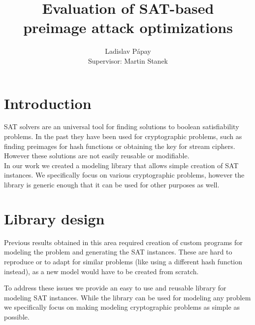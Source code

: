 \documentclass[myposter,portrait]{sciposter}
\def\mysection#1{
{\color{sectionCol}\section*{\sc\bfseries #1}}}
\begin{document}
\setlength{\logowidth}{20cm}
\setlength{\titlewidth}{\textwidth}
\addtolength{\titlewidth}{-\logowidth}
\useleftlogofalse

\color{textCol}

\title{Evaluation of SAT-based\\ preimage attack optimizations}
\author{Ladislav P\'apay\\
        Supervisor: Martin Stanek}
\maketitle

\begin{multicols*}{3}

\mysection{Introduction}
SAT solvers are an universal tool for finding solutions to boolean satisfiability problems.
In the past they have been used for cryptographic problems, such as finding preimages for hash functions or obtaining the key for stream ciphers.
However these solutions are not easily reusable or modifiable.
~\\

In our work we created a modeling library that allows simple creation of SAT instances.
We specifically focus on various cryptographic problems, however the library is generic enough that it can be used for other purposes as well.


\mysection{Library design}
Previous results obtained in this area required creation of custom programs for modeling the problem and generating the SAT instances.
These are hard to reproduce or to adapt for similar problems (like using a different hash function instead), as a new model would have to be created from scratch.

To address these issues we provide an easy to use and reusable library for modeling SAT instances.
While the library can be used for modeling any problem we specifically focus on making modeling cryptographic problems as simple as possible.
~\\


\end{multicols*}
\end{document}
